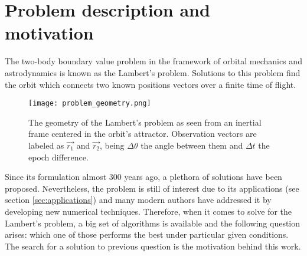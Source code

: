 \section{Problem description and motivation}

The two-body boundary value problem in the framework of orbital mechanics and
astrodynamics is known as the Lambert's problem. Solutions to this problem find
the orbit which connects two known positions vectors over a finite time of
flight.

\begin{figure}[H]
  \centering
  \texttt{[image: problem\_geometry.png]}
  \caption{
    The geometry of the Lambert's problem as seen from an inertial frame
    centered in the orbit's attractor. Observation vectors are labeled as
    $\vec{r_{1}}$ and $\vec{r_{2}}$, being $\Delta \theta$ the angle between
    them and $\Delta t$ the epoch difference.
  }
  \label{fig:problem_geometry}
\end{figure}

Since its formulation almost 300 years ago, a plethora of solutions have been
proposed. Nevertheless, the problem is still of interest due to its applications
(see section \ref{sec:applications}) and many modern authors have addressed it
by developing new numerical techniques. Therefore, when it comes to solve for
the Lambert's problem, a big set of algorithms is available and the following
question arises: which one of those performs the best under particular given
conditions. The search for a solution to previous question is the motivation
behind this work.

